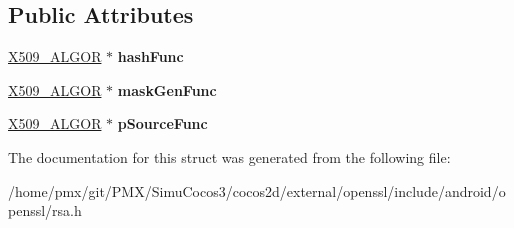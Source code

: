 \subsection*{Public Attributes}
\begin{DoxyCompactItemize}
\item 
\mbox{\label{structrsa__oaep__params__st_ae3e0235cb47af4acaf2c0224f64b96fc}} 
\hyperlink{structX509__algor__st}{X509\+\_\+\+A\+L\+G\+OR} $\ast$ {\bfseries hash\+Func}
\item 
\mbox{\label{structrsa__oaep__params__st_a967ebf17bdb8081b22234cc14ec8fb56}} 
\hyperlink{structX509__algor__st}{X509\+\_\+\+A\+L\+G\+OR} $\ast$ {\bfseries mask\+Gen\+Func}
\item 
\mbox{\label{structrsa__oaep__params__st_a9345b355109ac208a3aa11befaeb6000}} 
\hyperlink{structX509__algor__st}{X509\+\_\+\+A\+L\+G\+OR} $\ast$ {\bfseries p\+Source\+Func}
\end{DoxyCompactItemize}


The documentation for this struct was generated from the following file\+:\begin{DoxyCompactItemize}
\item 
/home/pmx/git/\+P\+M\+X/\+Simu\+Cocos3/cocos2d/external/openssl/include/android/openssl/rsa.\+h\end{DoxyCompactItemize}
